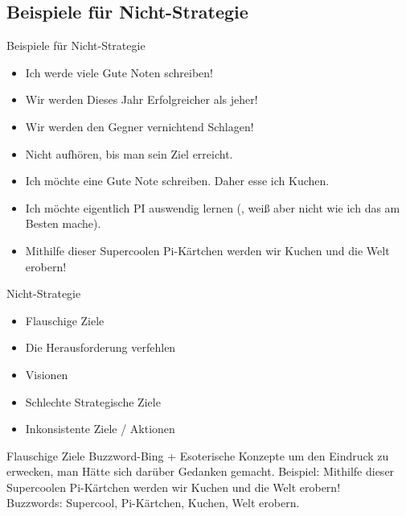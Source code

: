 \subsection{Beispiele für Nicht-Strategie}

\begin{frame}[c]{Beispiele für Nicht-Strategie}
    \begin{itemize}
            \iffinal
        \item Ich werde viele Gute Noten schreiben! \pause
        \item Wir werden Dieses Jahr Erfolgreicher als jeher! \pause
            \fi
        \item Wir werden den Gegner vernichtend Schlagen! \pause
        \item Nicht aufhören, bis man sein Ziel erreicht. \pause
        \item Ich möchte eine Gute Note schreiben. Daher esse ich Kuchen. \pause
        \item Ich möchte eigentlich PI auswendig lernen (, weiß aber nicht wie ich das am Besten mache). \pause
        \item Mithilfe dieser Supercoolen Pi-Kärtchen werden wir Kuchen und die Welt erobern!
    \end{itemize}
\end{frame}

\begin{frame}[c]{Nicht-Strategie}
    \large
    \begin{itemize}
        \item Flauschige Ziele
        \item Die Herausforderung verfehlen
        \item Visionen
        \item Schlechte Strategische Ziele
        \item Inkonsistente Ziele / Aktionen
    \end{itemize}
\end{frame}


\begin{frame}[c]{Flauschige Ziele}
    Buzzword-Bing + Esoterische Konzepte um den Eindruck zu erwecken,
    man Hätte sich darüber Gedanken gemacht.
    \newline
    \newline
    \pause
    Beispiel: Mithilfe dieser Supercoolen Pi-Kärtchen werden wir Kuchen und die Welt erobern! \pause \\
    Buzzwords: Supercool, Pi-Kärtchen, Kuchen, Welt erobern.
\end{frame}


